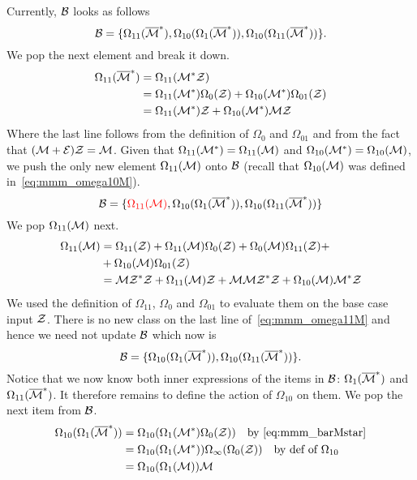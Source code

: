 \documentclass[12pt, a4paper, twoside]{report}
\begin{document}
Currently, $\mathcal{B}$ looks as follows
$$\mathcal{B} = \{\Omega_{11}(\overline{\mathcal{M}}^*), \Omega_{10}(\Omega_1(\overline{\mathcal{M}}^*)), \Omega_{10}(\Omega_{11}(\overline{\mathcal{M}}^*))\}.$$
We pop the next element and break it down.
\begin{align}
  \begin{aligned}
    \Omega_{11}(\overline{\mathcal{M}}^*) &= \Omega_{11}(\mathcal{M}^*\mathcal{Z})\\
    &= \Omega_{11}(\mathcal{M}^*)\Omega_0(\mathcal{Z}) + \Omega_{10}(\mathcal{M}^*)\Omega_{01}(\mathcal{Z})\\
    &= \Omega_{11}(\mathcal{M}^*)\mathcal{Z} + \Omega_{10}(\mathcal{M}^*)\mathcal{M}\mathcal{Z}
  \end{aligned}
\end{align}
Where the last line follows from the definition of $\Omega_{0}$ and $\Omega_{01}$ and from the fact that $(\mathcal{M}+\mathcal{E})\mathcal{Z} = \mathcal{M}$. Given that $\Omega_{11}(\mathcal{M}^*) = \Omega_{11}(\mathcal{M})$ and $\Omega_{10}(\mathcal{M}^*) = \Omega_{10}(\mathcal{M})$, we push the only new element $\Omega_{11}(\mathcal{M})$ onto $\mathcal{B}$ (recall that $\Omega_{10}(\mathcal{M})$ was defined in~\eqref{eq:mmm_omega10M}).
$$\mathcal{B} = \{\textcolor{red}{\Omega_{11}(\mathcal{M})}, \Omega_{10}(\Omega_1(\overline{\mathcal{M}}^*)), \Omega_{10}(\Omega_{11}(\overline{\mathcal{M}}^*))\}$$
We pop $\Omega_{11}(\mathcal{M})$ next.
\begin{align}
  \begin{aligned}
    \Omega_{11}(\mathcal{M}) &= \Omega_{11}(\mathcal{Z}) + \Omega_{11}(\mathcal{M})\Omega_0(\mathcal{Z}) + \Omega_0(\mathcal{M})\Omega_{11}(\mathcal{Z}) +\\
    &+\Omega_{10}(\mathcal{M})\Omega_{01}(\mathcal{Z})\\
    &= \mathcal{M}\mathcal{Z}^*\mathcal{Z} + \Omega_{11}(\mathcal{M})\mathcal{Z} + \mathcal{M}\mathcal{M}\mathcal{Z}^*\mathcal{Z} + \Omega_{10}(\mathcal{M})\mathcal{M}^*\mathcal{Z}
  \end{aligned}
      \label{eq:mmm_omega11M}
\end{align}
We used the definition of $\Omega_{11}$, $\Omega_{0}$ and $\Omega_{01}$ to evaluate them on the base case input $\mathcal{Z}$. There is no new class on the last line of~\eqref{eq:mmm_omega11M} and hence we need not update $\mathcal{B}$ which now is
$$\mathcal{B} = \{\Omega_{10}(\Omega_1(\overline{\mathcal{M}}^*)), \Omega_{10}(\Omega_{11}(\overline{\mathcal{M}}^*))\}.$$
Notice that we now know both inner expressions of the items in $\mathcal{B}$: $\Omega_1(\overline{\mathcal{M}}^*)$ and $\Omega_{11}(\overline{\mathcal{M}}^*)$. It therefore remains to define the action of $\Omega_{10}$ on them. We pop the next item from $\mathcal{B}$.
\begin{align}
  \begin{aligned}
  \Omega_{10}(\Omega_1(\overline{\mathcal{M}}^*)) &= \Omega_{10}(\Omega_1(\mathcal{M}^*)\Omega_0(\mathcal{Z}))\quad \text{by~\eqref{eq:mmm_barMstar}}\\
                                   &= \Omega_{10}(\Omega_1(\mathcal{M}^*))\Omega_\infty(\Omega_0(\mathcal{Z}))\quad \text{by def of $\Omega_{10}$}\\
                                   &= \Omega_{10}(\Omega_1(\mathcal{M}))\mathcal{M}
                                   \end{aligned}
\end{align}
\end{document}
